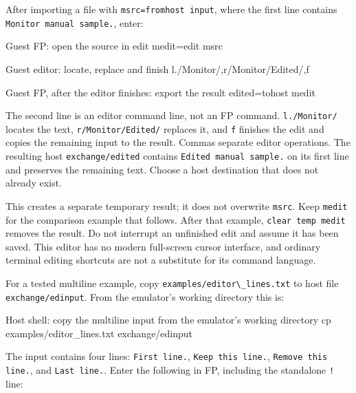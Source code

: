 After importing a file with \passthrough{\lstinline!msrc=fromhost input!}, where the first line contains \passthrough{\lstinline!Monitor manual sample.!}, enter:

\begin{commandexample}{Guest FP: open the source in edit}
medit=edit msrc
\end{commandexample}

\begin{commandexample}{Guest editor: locate, replace and finish}
l./Monitor/,r/Monitor/Edited/,f
\end{commandexample}

\begin{commandexample}{Guest FP, after the editor finishes: export the result}
edited=tohost medit
\end{commandexample}

The second line is an editor command line, not an FP command. \passthrough{\lstinline!l./Monitor/!} locates the text, \passthrough{\lstinline!r/Monitor/Edited/!} replaces it, and \passthrough{\lstinline!f!} finishes the edit and copies the remaining input to the result. Commas separate editor operations. The resulting host \passthrough{\lstinline!exchange/edited!} contains \passthrough{\lstinline!Edited manual sample.!} on its first line and preserves the remaining text. Choose a host destination that does not already exist.

This creates a separate temporary result; it does not overwrite \passthrough{\lstinline!msrc!}. Keep \passthrough{\lstinline!medit!} for the comparison example that follows.
After that example, \passthrough{\lstinline!clear temp medit!} removes the result. Do not interrupt an unfinished edit and assume it has been saved. This editor has no modern full-screen cursor interface, and ordinary terminal editing shortcuts are not a substitute for its command language.

For a tested multiline example, copy \passthrough{\lstinline!examples/editor\_lines.txt!} to host file \passthrough{\lstinline!exchange/edinput!}. From the emulator's working directory this is:

\begin{commandexample}[language=sh]{Host shell: copy the multiline input from the emulator's working directory}
cp examples/editor_lines.txt exchange/edinput
\end{commandexample}

The input contains four lines: \passthrough{\lstinline!First line.!}, \passthrough{\lstinline!Keep this line.!}, \passthrough{\lstinline!Remove this line.!}, and \passthrough{\lstinline!Last line.!}. Enter the following in FP, including the standalone \passthrough{\lstinline"!"} line:

